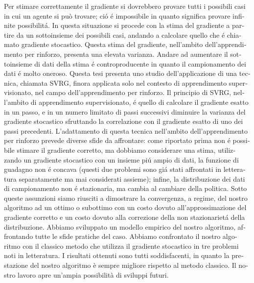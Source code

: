 \begin{otherlanguage}{italian}
Per stimare correttamente il gradiente si dovrebbero provare tutti i possibili casi in cui un agente si può trovare; ci\'o \'e impossibile in quanto significa provare infinite possibilit\'a.
In questa situazione si procede con la stima del gradiente a partire da un sottoinsieme dei possibili casi, andando a calcolare quello che \'e chiamato gradiente stocastico.
Questa stima del gradiente, nell'ambito dell'apprendimento per rinforzo, presenta una elevata varianza. 
Andare ad aumentare il sottoinsieme di dati della stima \'e controproducente in quanto il campionamento dei dati \'e molto oneroso.\newline
Questa tesi presenta uno studio dell'applicazione di una tecnica, chiamata SVRG, finora applicata solo nel contesto di apprendimento supervisionato, nel campo dell'apprendimento per rinforzo. 
Il principio di SVRG, nell'ambito di apprendimento supervisionato, \'e quello di calcolare il gradiente esatto in un passo, e in un numero limitato di passi successivi diminuire la varianza del gradiente stocastico sfruttando la correlazione con il gradiente esatto di uno dei passi precedenti.\newline
L'adattamento di questa tecnica nell'ambito dell'apprendimento per rinforzo prevede diverse sfide da affrontare: come riportato prima non \'e possibile stimare il gradiente corretto, ma dobbiamo considerare una stima, utilizzando un gradiente stocastico con un insieme pi\'u ampio di dati, la funzione di guadagno non \'e concava (questi due problemi sono gi\'a stati affrontati in letteratura separatamente ma mai considerati assieme); infine, la distribuzione dei dati di campionamento non \'e stazionaria, ma cambia al cambiare della politica. \newline
Sotto queste assunzioni siamo riusciti a dimostrare la convergenza, a regime, del nostro algoritmo ad un ottimo o subottimo con un costo dovuto all'approssimazione del gradiente corretto e un costo dovuto alla correzione della non stazionariet\'a della distribuzione.\newline
Abbiamo sviluppato un modello empirico del nostro algoritmo, affrontando tutte le sfide pratiche del caso. Abbiamo confrontato il nostro algoritmo con il classico metodo che utilizza il gradiente stocastico in tre problemi noti in letteratura. I risultati ottenuti sono tutti soddisfacenti, in quanto la prestazione del nostro algoritmo è sempre migliore rispetto al metodo classico. \newline
Il nostro lavoro apre un'ampia possibilità di sviluppi futuri.
\end{otherlanguage}

\endgroup

